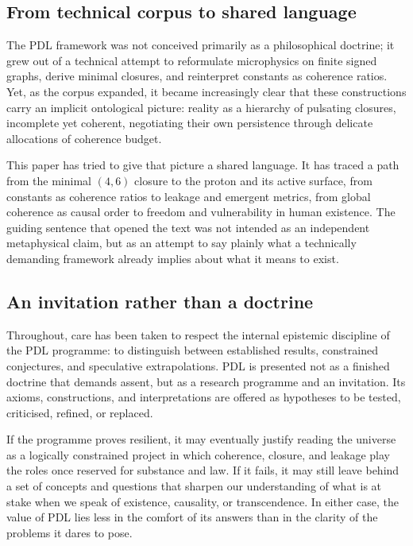 \documentclass[11pt,a4paper]{article}
\theoremstyle{definition}
\begin{document}
\subsection{From technical corpus to shared language}

The PDL framework was not conceived primarily as a philosophical doctrine; it grew out of a technical attempt to reformulate microphysics on finite signed graphs, derive minimal closures, and reinterpret constants as coherence ratios.\cite{Laubscher_EmergencePhysicalReality_2024,Laubscher_MinimalClosures_46_2024,Laubscher_Alpha_v2_2024,Laubscher_UniversalCoherenceLeakage_2024} Yet, as the corpus expanded, it became increasingly clear that these constructions carry an implicit ontological picture: reality as a hierarchy of pulsating closures, incomplete yet coherent, negotiating their own persistence through delicate allocations of coherence budget.

This paper has tried to give that picture a shared language. It has traced a path from the minimal \((4,6)\) closure to the proton and its active surface, from constants as coherence ratios to leakage and emergent metrics, from global coherence as causal order to freedom and vulnerability in human existence.\cite{Laubscher_ProtonArch_v2_2024,Laubscher_EffectiveFields_2024,Laubscher_CavityModes_PDL_2024,Laubscher_Existence_PulsatingClosure_2026} The guiding sentence that opened the text was not intended as an independent metaphysical claim, but as an attempt to say plainly what a technically demanding framework already implies about what it means to exist.

\subsection{An invitation rather than a doctrine}

Throughout, care has been taken to respect the internal epistemic discipline of the PDL programme: to distinguish between established results, constrained conjectures, and speculative extrapolations.\cite{Laubscher_PDL_Position_2024,Laubscher_PDL_GlobalMapping_v6_2024} PDL is presented not as a finished doctrine that demands assent, but as a research programme and an invitation. Its axioms, constructions, and interpretations are offered as hypotheses to be tested, criticised, refined, or replaced.

If the programme proves resilient, it may eventually justify reading the universe as a logically constrained project in which coherence, closure, and leakage play the roles once reserved for substance and law. If it fails, it may still leave behind a set of concepts and questions that sharpen our understanding of what is at stake when we speak of existence, causality, or transcendence. In either case, the value of PDL lies less in the comfort of its answers than in the clarity of the problems it dares to pose.
\end{document}
